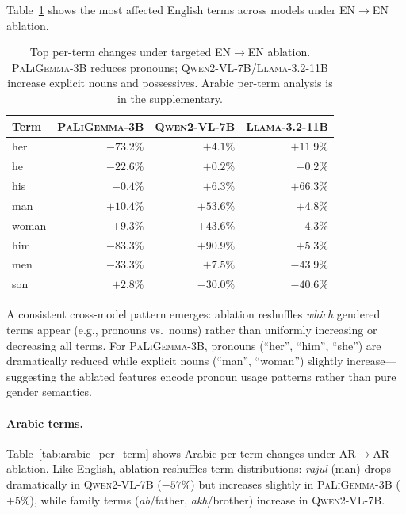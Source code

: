 \documentclass[11pt,a4paper]{article}
\newcommand{\modelname}[1]{\textsc{#1}}
\newcommand{\pali}{\modelname{PaLiGemma-3B}}
\newcommand{\qwen}{\modelname{Qwen2-VL-7B}}
\newcommand{\llama}{\modelname{Llama-3.2-11B}}
\begin{document}
Table~\ref{tab:per_term} shows the most affected English terms across models under EN$\to$EN ablation.

\begin{table}[h]
\centering
\small
\caption{Top per-term changes under targeted EN$\to$EN ablation. \pali{} reduces pronouns; \qwen{}/\llama{} increase explicit nouns and possessives. Arabic per-term analysis is in the supplementary.}
\label{tab:per_term}
\begin{tabular}{@{}lrrr@{}}
\toprule
\textbf{Term} & \textbf{\pali{}} & \textbf{\qwen{}} & \textbf{\llama{}} \\
\midrule
her & $-73.2\%$ & $+4.1\%$ & $+11.9\%$ \\
he & $-22.6\%$ & $+0.2\%$ & $-0.2\%$ \\
his & $-0.4\%$ & $+6.3\%$ & $+66.3\%$ \\
man & $+10.4\%$ & $+53.6\%$ & $+4.8\%$ \\
woman & $+9.3\%$ & $+43.6\%$ & $-4.3\%$ \\
him & $-83.3\%$ & $+90.9\%$ & $+5.3\%$ \\
men & $-33.3\%$ & $+7.5\%$ & $-43.9\%$ \\
son & $+2.8\%$ & $-30.0\%$ & $-40.6\%$ \\
\bottomrule
\end{tabular}
\end{table}

A consistent cross-model pattern emerges: ablation reshuffles \emph{which} gendered terms appear (e.g., pronouns vs.\ nouns) rather than uniformly increasing or decreasing all terms.
For \pali{}, pronouns (``her'', ``him'', ``she'') are dramatically reduced while explicit nouns (``man'', ``woman'') slightly increase---suggesting the ablated features encode pronoun usage patterns rather than pure gender semantics.

\paragraph{Arabic terms.}
Table~\ref{tab:arabic_per_term} shows Arabic per-term changes under AR$\to$AR ablation.
Like English, ablation reshuffles term distributions: \emph{rajul} (man) drops dramatically in \qwen{} ($-57\%$) but increases slightly in \pali{} ($+5\%$), while family terms (\emph{ab}/father, \emph{akh}/brother) increase in \qwen{}.
\end{document}
